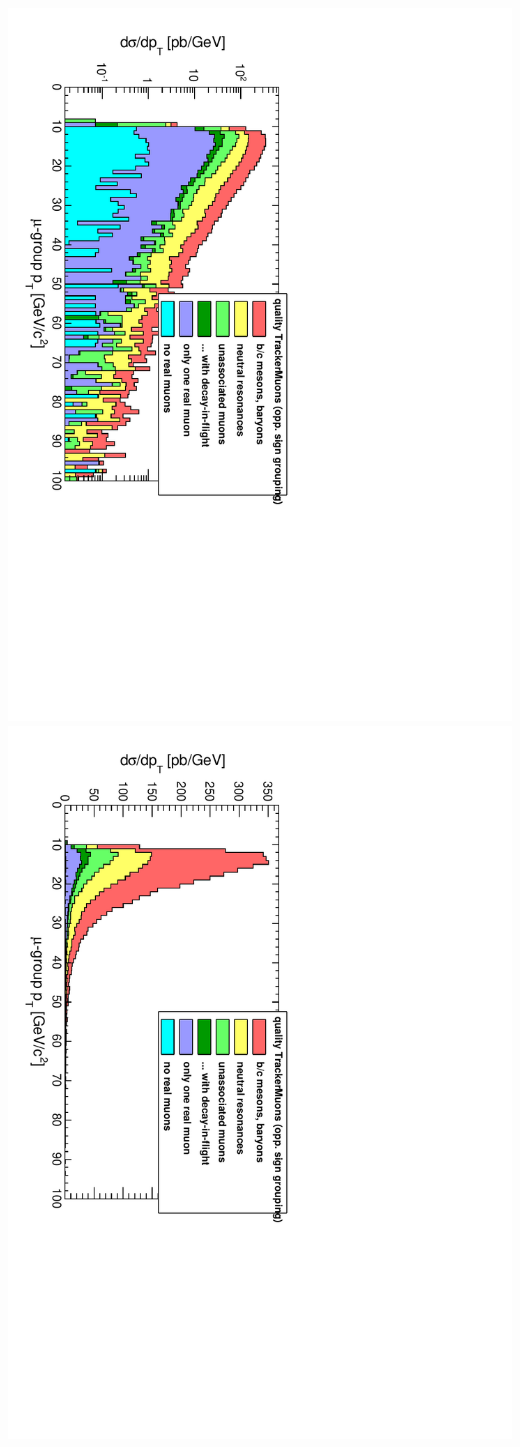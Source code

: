\documentclass[compress]{beamer}
\begin{document}
\begin{frame}
{\includegraphics[height=0.5\linewidth, angle=90]{ptlog_QualityTrackerMuonOpposite.pdf}
\includegraphics[height=0.5\linewidth, angle=90]{ptlinear_QualityTrackerMuonOpposite.pdf}}
\end{frame}
\end{document}
